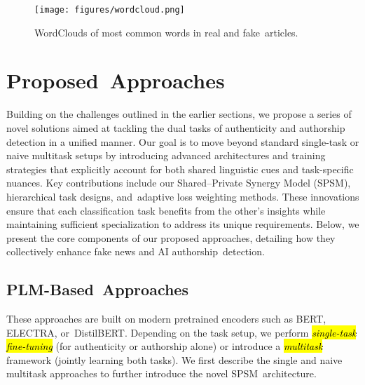 \documentclass[electronics,article,accept,pdftex,moreauthors,electronics]{Definitions/mdpi}
\begin{document}
\begin{figure}[H] 
    \texttt{[image: figures/wordcloud.png]}
    \caption{WordClouds of most common words in real and fake~articles.}
    \label{fig3}
\end{figure}


\section{Proposed~Approaches}\label{S4}

Building on the challenges outlined in the earlier sections, we propose a series of novel solutions aimed at tackling the dual tasks of authenticity and authorship detection in a unified manner. Our goal is to move beyond standard single-task or naive multitask setups by introducing advanced architectures and training strategies that explicitly account for both shared linguistic cues and task-specific nuances. Key contributions include our Shared--Private Synergy Model (SPSM), hierarchical task designs, and~adaptive loss weighting methods. These innovations ensure that each classification task benefits from the other’s insights while maintaining sufficient specialization to address its unique requirements. Below, we present the core components of our proposed approaches, detailing how they collectively enhance fake news and AI authorship~detection.

\subsection{PLM-Based~Approaches}

These approaches are built on modern pretrained encoders such as BERT, ELECTRA, or~DistilBERT. Depending on the task setup, we perform \emph{\hl{single-task fine-tuning}} %
 (for authenticity or authorship alone) or introduce a \emph{\hl{multitask}} framework (jointly learning both tasks). We first describe the single and naive multitask approaches to further introduce the novel SPSM~architecture.

\end{document}
